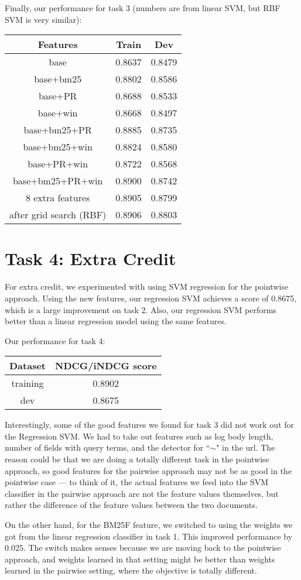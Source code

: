 \documentclass[10pt,twocolumn]{article}
\begin{document}
Finally, our performance for task 3 (numbers are from linear SVM, but RBF SVM is very similar):
\begin{table}[H] 
\centering
\begin{tabular}{|c|c|c|}
\hline
Features &Train& Dev \\\hline
base & 0.8637 & 0.8479\\\hline
base+bm25 & 0.8802 & 0.8586\\\hline
base+PR & 0.8688 & 0.8533\\\hline
base+win & 0.8668 & 0.8497\\\hline
base+bm25+PR & 0.8885 & 0.8735\\\hline
base+bm25+win & 0.8824 & 0.8580\\\hline
base+PR+win & 0.8722 & 0.8568\\\hline
base+bm25+PR+win & 0.8900 & 0.8742\\\hline
8 extra features & 0.8905 & 0.8799\\\hline
after grid search (RBF)  & 0.8906 & 0.8803\\\hline
\end{tabular}
\end{table}

\section*{Task 4: Extra Credit}
For extra credit, we experimented with using SVM regression for the pointwise approach. Using the new features, our regression SVM achieves a score of 0.8675, which is a large improvement on task 2. Also, our regression SVM performs better than a linear regression model using the same features.

Our performance for task 4:
\begin{table}[H]
\centering
\begin{tabular}{|c|c|}
\hline
Dataset & NDCG/iNDCG score \\\hline
training & 0.8902\\\hline
dev & 0.8675\\\hline
\end{tabular}
\end{table}

Interestingly, some of the good features we found for task 3 did not work out for the Regression SVM. We had to take out features such as log body length, number of fields with query terms, and the detector for ``$\sim$" in the url. The reason could be that we are doing a totally different task in the pointwise approach, so good features for the pairwise approach may not be as good in the pointwise case --- to think of it, the actual features we feed into the SVM classifier in the pairwise approach are not the feature values themselves, but rather the difference of the feature values between the two documents.

On the other hand, for the BM25F feature, we switched to using the weights we got from the linear regression classifier in task 1. This improved performance by 0.025. The switch makes senses because we are moving back to the pointwise approach, and weights learned in that setting might be better than weights learned in the pairwise setting, where the objective is totally different.
\end{document}
